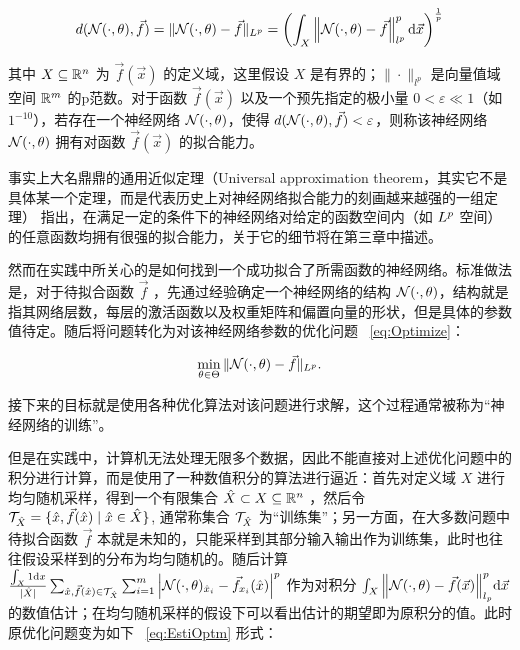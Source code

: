 \begin{equation}
    \begin{aligned}
        d(\NNF,\vec{f}) = \| \NNF-\vec{f} \|_{\Lp} = \left( \int_{X} \left\| \NNF-\vec{f} \right\|^{p}_{l^{p}} \mathrm{d}\vec{x} \right)^{\frac{1}{p}}
    \end{aligned}
\end{equation}

其中 $X \subseteq \R[n]$ 为 $\vec{f}(\vec{x})$ 的定义域，这里假设 $X$ 是有界的；$\| \cdot \|_{l^{p}}$ 是向量值域空间 $\R[m]$ 的p范数。对于函数 $\vec{f}(\vec{x})$ 以及一个预先指定的极小量 $0 < \varepsilon \ll 1$（如 $1^{-10}$），若存在一个神经网络 $\NNF$，使得 $d(\NNF,\vec{f}) < \varepsilon$，则称该神经网络 $\NNF$ 拥有对函数 $\vec{f}(\vec{x})$ 的拟合能力。

事实上大名鼎鼎的通用近似定理（Universal approximation theorem，其实它不是具体某一个定理，而是代表历史上对神经网络拟合能力的刻画越来越强的一组定理）\cite{hornik1991approximation,hornik1989multilayer,hornik1990universal} 指出，在满足一定的条件下的神经网络对给定的函数空间内（如 $\Lp$ 空间）的任意函数均拥有很强的拟合能力，关于它的细节将在第三章中描述。

然而在实践中所关心的是如何找到一个成功拟合了所需函数的神经网络。标准做法是，对于待拟合函数 $\vec{f}$ ，先通过经验确定一个神经网络的结构 $\NNF$，结构就是指其网络层数，每层的激活函数以及权重矩阵和偏置向量的形状，但是具体的参数值待定。随后将问题转化为对该神经网络参数的优化问题 ~\eqref{eq:Optimize}：

\begin{equation} \label{eq:Optimize}
    \begin{aligned}
        \min_{\params \in \paramset} \| \NNF- \vec{f}\|_{\Lp}.
    \end{aligned}
\end{equation}

接下来的目标就是使用各种优化算法对该问题进行求解，这个过程通常被称为“神经网络的训练”。

但是在实践中，计算机无法处理无限多个数据，因此不能直接对上述优化问题中的积分进行计算，而是使用了一种数值积分的算法进行逼近：首先对定义域 $X$ 进行均匀随机采样，得到一个有限集合 $\hat{X}  \subset X \subseteq \R[n]$ ，然后令 $\toTset{\hat{X}} = \{\x,\vec{f}(\x) \mid \x \in \hat{X}\}$, 通常称集合 $\toTset{\hat{X}}$ 为“训练集”；另一方面，在大多数问题中待拟合函数 $\vec{f}$ 本就是未知的，只能采样到其部分输入输出作为训练集，此时也往往假设采样到的分布为均匀随机的。随后计算 $\frac{\toInt{X}{1}{x}}{|\hat{X}|}\sum_{\x,\vec{f}(\x) \in \toTset{\hat{X}}} \sum_{i=1}^{m} \left| \NNF_{\x_i} - \vec{f}_{x_i}(\x) \right|^{p}$ 作为对积分 $\toInt{X}{\left\| \NNF-\vec{f}(\vec{x}) \right\|_{l_p}^{p}}{\vec{x}}$ 的数值估计；在均匀随机采样的假设下可以看出估计的期望即为原积分的值。此时原优化问题变为如下 ~\eqref{eq:EstiOptm} 形式：

